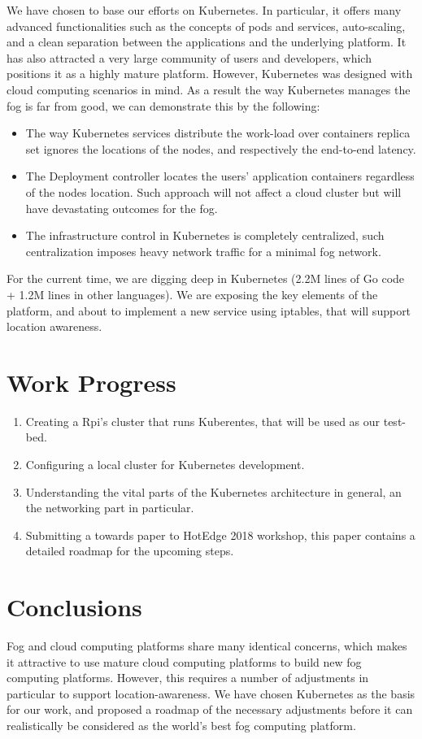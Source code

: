 \documentclass[10pt,twocolumn,letterpaper]{article}
\begin{document}
We have chosen to base our efforts on Kubernetes.  In particular, it offers many advanced functionalities such as the concepts of pods and services, auto-scaling, and a clean separation between the applications and the underlying platform. It has also attracted a very large community of users and developers, which positions it as a highly mature platform. However, Kubernetes was designed with cloud computing scenarios in mind. As a result the way Kubernetes manages the fog is far from good, we can demonstrate this by the following: 
\begin{itemize}
\item The way Kubernetes services distribute the work-load over containers replica set ignores the locations of the nodes, and  respectively the end-to-end latency.
\item The Deployment controller locates the users' application containers regardless of the nodes location. Such approach will not affect a cloud cluster but will have devastating outcomes for the fog. 
\item The infrastructure control in Kubernetes is completely centralized, such centralization imposes heavy network traffic for a minimal fog network. 
\end{itemize}

For the current time, we are digging deep in Kubernetes (2.2M lines of Go code + 1.2M lines in other languages). We are exposing the key elements of the platform, and about to implement a new service using iptables, that will support location awareness. 

\section{Work Progress}
\begin{enumerate}
\item Creating a Rpi's cluster that runs Kuberentes, that will be used as our test-bed. 
\item Configuring a local cluster for Kubernetes development.
\item Understanding the vital parts of the Kubernetes architecture in general, an the networking part in particular.
\item Submitting a towards paper to HotEdge 2018 workshop\cite{ali}, this paper contains a detailed roadmap for the upcoming steps. 
  
\end{enumerate}


\section*{Conclusions}

Fog and cloud computing platforms share many identical concerns, which
makes it attractive to use mature cloud computing platforms to build
new fog computing platforms. However, this requires a number of
adjustments in particular to support location-awareness. We have
chosen Kubernetes as the basis for our work, and proposed a roadmap of
the necessary adjustments before it can realistically be considered as
the world's best fog computing platform.

{}

\end{document}
